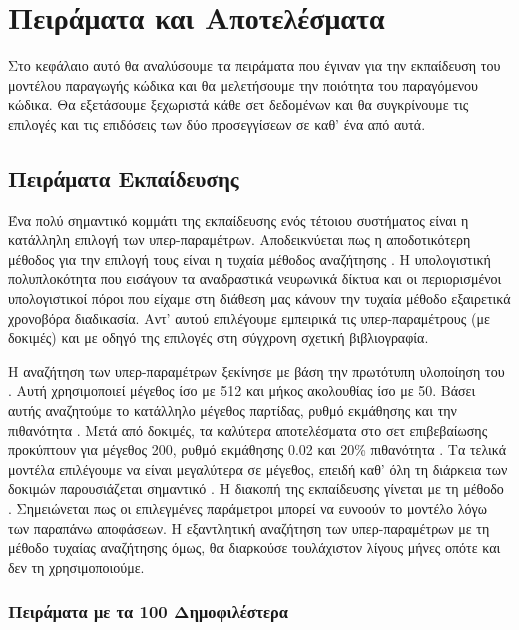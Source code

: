 \chapter{Πειράματα και Αποτελέσματα}

Στο κεφάλαιο αυτό θα αναλύσουμε τα πειράματα που έγιναν για την εκπαίδευση του μοντέλου παραγωγής κώδικα και θα μελετήσουμε την ποιότητα του παραγόμενου κώδικα.
Θα εξετάσουμε ξεχωριστά κάθε σετ δεδομένων και θα συγκρίνουμε τις επιλογές και τις επιδόσεις των δύο προσεγγίσεων σε καθ' ένα από αυτά.

\section{Πειράματα Eκπαίδευσης}

Ένα πολύ σημαντικό κομμάτι της εκπαίδευσης ενός τέτοιου συστήματος είναι η κατάλληλη επιλογή των υπερ-παραμέτρων.
Αποδεικνύεται πως η αποδοτικότερη μέθοδος για την επιλογή τους είναι η τυχαία μέθοδος αναζήτησης \cite{Bergstra2012}.
Η υπολογιστική πολυπλοκότητα που εισάγουν τα αναδραστικά νευρωνικά δίκτυα και οι περιορισμένοι υπολογιστικοί πόροι που είχαμε στη διάθεση μας κάνουν την τυχαία μέθοδο εξαιρετικά χρονοβόρα διαδικασία.
Αντ' αυτού επιλέγουμε εμπειρικά τις υπερ-παραμέτρους (με δοκιμές) και με οδηγό της επιλογές στη σύγχρονη σχετική βιβλιογραφία.

Η αναζήτηση των υπερ-παραμέτρων ξεκίνησε με βάση την πρωτότυπη υλοποίηση του .
Αυτή χρησιμοποιεί μέγεθος  ίσο με 512 και μήκος ακολουθίας ίσο με 50. Βάσει αυτής αναζητούμε το κατάλληλο μέγεθος παρτίδας, ρυθμό εκμάθησης και την πιθανότητα .
Μετά από δοκιμές, τα καλύτερα αποτελέσματα στο σετ επιβεβαίωσης προκύπτουν για μέγεθος  200, ρυθμό εκμάθησης 0.02 και 20\% πιθανότητα .
Τα τελικά μοντέλα επιλέγουμε να είναι μεγαλύτερα σε μέγεθος, επειδή καθ' όλη τη διάρκεια των δοκιμών παρουσιάζεται σημαντικό .
Η διακοπή της εκπαίδευσης γίνεται με τη μέθοδο .
Σημειώνεται πως οι επιλεγμένες παράμετροι μπορεί να ευνοούν το μοντέλο  λόγω των παραπάνω αποφάσεων.
Η εξαντλητική αναζήτηση των υπερ-παραμέτρων με τη μέθοδο τυχαίας αναζήτησης όμως, θα διαρκούσε τουλάχιστον λίγους μήνες οπότε και δεν τη χρησιμοποιούμε.

\subsection{Πειράματα με τα 100 Δημοφιλέστερα }

